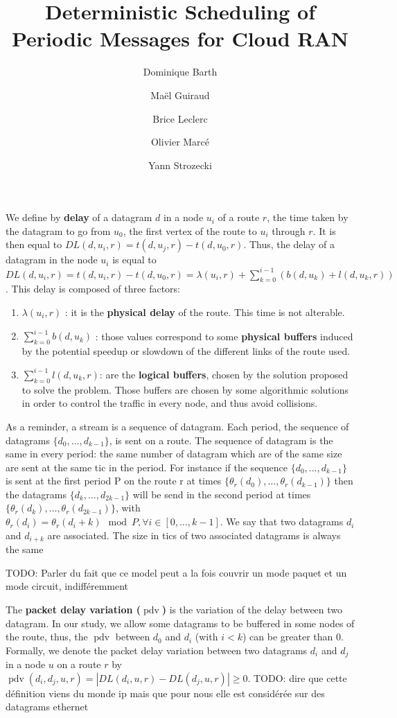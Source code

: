 \documentclass[10pt]{article}
\title{Deterministic Scheduling of Periodic Messages for Cloud RAN}
\author[1]{Dominique Barth}
\author[1,2]{Ma\"el Guiraud}
\author[2]{Brice Leclerc}
\author[2]{Olivier Marc\'e}
\author[1]{Yann Strozecki}
\affil[1]{David Laboratory, UVSQ}
\affil[2]{Nokia Bell Labs France}
\DeclareMathOperator{\pdv}{pdv}
\newcommand{\todo}[1]{{\color{red} TODO: {#1}}}
\begin{document}
We define by {\bf delay} of a datagram $d$ in a node $u_i$ of a route $r$, the time taken by the datagram to go from $u_0$, the first vertex of the route to $u_i$ through $r$. It is then equal to $DL(d,u_i,r) = t(d,u_j,r) - t(d,u_0,r)$. 
 Thus, the delay of a datagram in the node $u_i$ is equal to $DL(d,u_i,r) =  t(d,u_i,r) - t(d,u_0,r) = \lambda(u_i,r) + \sum_{k=0}^{i-1}( b(d,u_k) + l(d,u_k,r))$.
This delay is composed of three factors:
\begin{enumerate}
\item $\lambda(u_i,r)$ : it is the {\bf physical delay} of the route. This time is not alterable. 
\item  $\sum_{k=0}^{i-1} b(d,u_k)$ : those values correspond to some {\bf physical buffers } induced by the potential speedup or slowdown of the different links of the route used.
\item $\sum_{k=0}^{i-1} l(d,u_k,r)$: are the {\bf logical buffers}, chosen by the solution proposed to solve the problem. Those buffers are chosen by some algorithmic solutions in order to control the traffic in every node, and thus avoid collisions.
\end{enumerate}

As a reminder, a stream is a sequence of datagram. Each period, the sequence of datagrams $\{d_0,\ldots,d_{k-1}\}$, is sent on a route. The sequence of datagram is the same in every period: the same number of datagram which are of the same size are sent at the same tic in the period. For instance if the sequence $\{d_0,\ldots,d_{k-1}\}$ is sent at the first period P on the route r at times $\{\theta_r(d_0),\ldots,\theta_r(d_{k-1})\}$ then the datagrams $\{d_k,\ldots,d_{2k-1}\}$ will be send in the second period at times $\{\theta_r(d_k),\ldots,\theta_r(d_{2k-1})\}$, with $\theta_r(d_i) = \theta_r(d_i+k) \mod P, \forall i \in [0,\ldots,k-1]$. We say that two datagrams $d_i$ and $d_{i+k}$ are associated. The size in tics of two associated datagrams is always the same

\todo{Parler du fait que ce model peut a la fois couvrir un mode paquet et un mode circuit, indifféremment }


The {\bf packet delay variation ($\pdv$) }\cite{demichelis_ip_nodate} is the variation of the delay between two datagram. In our study, we allow some datagrams to be buffered in some nodes of the route, thus, the $\pdv$ between $d_0$ and $d_i$ (with $i<k$) can be greater than $0$. Formally, we denote the packet delay variation between two datagrams $d_i$ and $d_j$ in a node $u$ on a route $r$ by $\pdv(d_i,d_j,u,r) = |DL(d_i,u,r) - DL(d_j,u,r) | \ge 0$. 
\todo{dire que cette définition viens du monde ip mais que pour nous elle est considérée sur des datagrams ethernet}
\end{document}
